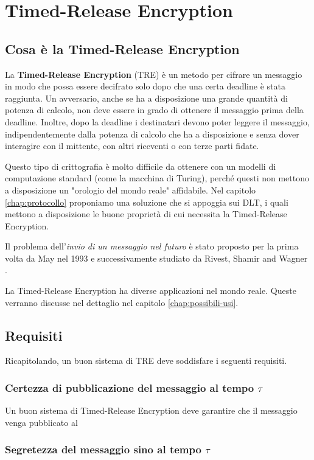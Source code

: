 \chapter{Timed-Release Encryption}

\section{Cosa è la Timed-Release Encryption}
La \textbf{Timed-Release Encryption} (TRE)
è un metodo per cifrare un messaggio in modo che possa
essere decifrato solo dopo che una certa deadline è stata raggiunta.
Un avversario, anche se ha a disposizione una grande quantità di potenza di calcolo,
non deve essere in grado di ottenere il messaggio prima della deadline.
Inoltre, dopo la deadline i destinatari devono poter leggere il messaggio,
indipendentemente dalla potenza di calcolo che ha a disposizione e
senza dover interagire con il mittente,
con altri riceventi o con terze parti fidate.

Questo tipo di crittografia è molto difficile da ottenere con un modelli
di computazione standard (come la macchina di Turing), perché questi non mettono
a disposizione un "orologio del mondo reale" affidabile.
Nel capitolo \ref{chap:protocollo} proponiamo una soluzione che si appoggia sui DLT,
i quali mettono a disposizione
le buone proprietà di cui necessita la Timed-Release Encryption.

Il problema dell'\textit{invio di un messaggio nel futuro} è stato proposto per la prima volta
da May \cite{May:time-released-crypto} nel 1993 e
successivamente studiato da Rivest, Shamir and Wagner \cite{Rivest96time-lockpuzzles}.

La Timed-Release Encryption ha diverse applicazioni nel mondo reale. Queste verranno
discusse nel dettaglio nel capitolo \ref{chap:possibili-usi}.

\section{Requisiti}
Ricapitolando, un buon sistema di TRE deve soddisfare i seguenti requisiti.

\subsection{Certezza di pubblicazione del messaggio al tempo $ \tau $}
Un buon sistema di Timed-Release Encryption deve garantire che il messaggio venga pubblicato al

\subsection{Segretezza del messaggio sino al tempo $ \tau $}
\label{subsec:segretezza-tre}


